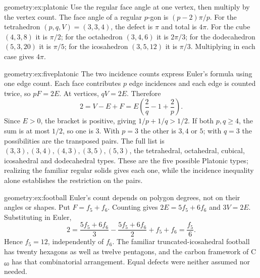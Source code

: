 \begin{solution}{geometry:ex:platonic}
\idea Use the regular face angle at one vertex, then multiply by the vertex count.
\writeup The face angle of a regular $p$-gon is $(p-2)\pi/p$. For the tetrahedron $(p,q,V)=(3,3,4)$, the defect is $\pi$ and total is $4\pi$. For the cube $(4,3,8)$ it is $\pi/2$; for the octahedron $(3,4,6)$ it is $2\pi/3$; for the dodecahedron $(5,3,20)$ it is $\pi/5$; for the icosahedron $(3,5,12)$ it is $\pi/3$. Multiplying in each case gives $4\pi$.
\end{solution}

\begin{solution}{geometry:ex:fiveplatonic}
\idea The two incidence counts express Euler's formula using one edge count.
\writeup Each face contributes $p$ edge incidences and each edge is counted twice, so $pF=2E$. At vertices, $qV=2E$. Therefore
\[
2=V-E+F=E\left(\frac2q-1+\frac2p\right).
\]
Since $E>0$, the bracket is positive, giving $1/p+1/q>1/2$. If both $p,q\ge4$, the sum is at most $1/2$, so one is $3$. With $p=3$ the other is $3,4$ or $5$; with $q=3$ the possibilities are the transposed pairs. The full list is $(3,3),(3,4),(4,3),(3,5),(5,3)$, the tetrahedral, octahedral, cubical, icosahedral and dodecahedral types. These are the five possible Platonic types; realizing the familiar regular solids gives each one, while the incidence inequality alone establishes the restriction on the pairs.
\end{solution}

\begin{solution}{geometry:ex:football}
\idea Euler's count depends on polygon degrees, not on their angles or shapes.
\writeup Put $F=f_5+f_6$. Counting gives $2E=5f_5+6f_6$ and $3V=2E$. Substituting in Euler,
\[
2=\frac{5f_5+6f_6}{3}-\frac{5f_5+6f_6}{2}+f_5+f_6
=\frac{f_5}{6}.
\]
Hence $f_5=12$, independently of $f_6$. The familiar truncated-icosahedral football has twenty hexagons as well as twelve pentagons, and the carbon framework of C$_{60}$ has that combinatorial arrangement. Equal defects were neither assumed nor needed.
\end{solution}

